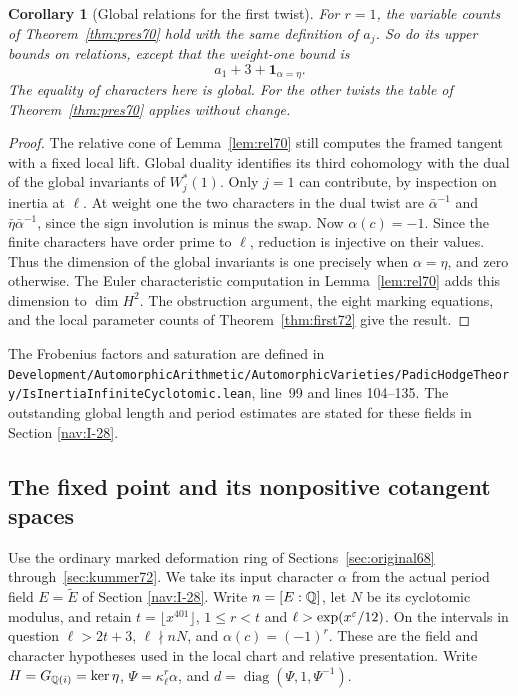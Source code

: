 \documentclass[a4paper,11pt]{article}
\newtheorem{corollary}[proposition]{Corollary}
\theoremstyle{definition}
\theoremstyle{remark}
\newcommand{\srcloc}[2]{{\small\nolinkurl{#1.lean}}, line~#2}
\numberwithin{equation}{section}
\begin{document}
\begin{corollary}[Global relations for the first twist]\label{cor:first72}
For \(r=1\), the variable counts of Theorem~\ref{thm:pres70}
hold with the same definition of \(a_j\). So do its upper
bounds on relations, except that the weight-one bound is
\[
                 a_1+3+\mathbf1_{\alpha=\eta}.
\]
The equality of characters here is global. For the other twists
the table of Theorem~\ref{thm:pres70} applies without change.
\end{corollary}
\begin{proof}
The relative cone of Lemma~\ref{lem:rel70} still computes the
framed tangent with a fixed local lift. Global duality identifies
its third cohomology with the dual of the global invariants
of \(W_j^*(1)\). Only \(j=1\) can contribute, by inspection
on inertia at \(\ell\). At weight one the two characters in
the dual twist are \(\bar\alpha^{-1}\) and
\(\bar\eta\bar\alpha^{-1}\), since the sign involution is minus
the swap. Now \(\alpha(c)=-1\). Since the finite characters
have order prime to \(\ell\), reduction is injective on their
values. Thus the dimension of the global invariants is one
precisely when \(\alpha=\eta\), and zero otherwise.
The Euler characteristic computation in Lemma~\ref{lem:rel70}
adds this dimension to \(\dim H^2\). The obstruction argument,
the eight marking equations, and the local parameter counts
of Theorem~\ref{thm:first72} give the result.
\end{proof}

The Frobenius factors and saturation are defined in
\srcloc{Development/AutomorphicArithmetic/AutomorphicVarieties/PadicHodgeTheory/IsInertiaInfiniteCyclotomic}{99}
and lines 104--135. The outstanding global length and period
estimates are stated for these fields in
Section \ref{nav:I-28}.

\subsection{The fixed point and its nonpositive cotangent spaces}\label{nav:IV-17}
\label{sec:origin116}

Use the ordinary marked deformation ring of Sections~\ref{sec:original68}
through~\ref{sec:kummer72}. We take its input character \(\alpha\)
from the actual period field \(E=\widetilde E\) of
Section \ref{nav:I-28}.
Write \(n=[E:\mathbb Q]\), let \(N\) be its cyclotomic modulus, and
retain \(t=\lfloor x^{401}\rfloor\), \(1\le r<t\) and
\(\ell>\exp(x^\varepsilon/12)\). On the intervals in question
\(\ell>2t+3\), \(\ell\nmid nN\), and
\(\alpha(c)=(-1)^r\). These are the field and character
hypotheses used in the local chart and relative presentation.
Write \(H=G_{\mathbb Q(i)}=\ker\eta\), \(\Psi=\kappa_\ell^r\alpha\),
and \(d=\operatorname{diag}(\Psi,1,\Psi^{-1})\).
\end{document}
